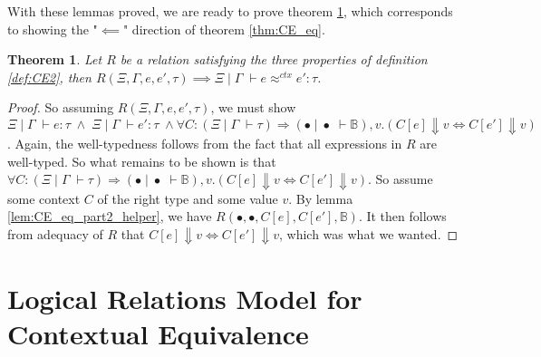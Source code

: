 \documentclass[a4paper, 11pt]{report}
\newtheorem{theorem}{Theorem}
\theoremstyle{definition}
\newcommand{\expr}{e}
\newcommand{\val}{v}
\newcommand{\ctx}{C}
\newcommand{\Tbool}{\mathbb{B}}
\newcommand{\typ}{\tau}
\newcommand{\venv}{\Gamma}
\newcommand{\tenv}{\Xi}
\newcommand{\emptenv}{\bullet}
\newcommand{\empvenv}{\bullet}
\newcommand{\jdg}[4]{#1 \; | \; #2 \; \vdash #3 : #4}
\newcommand{\jdgType}[3]{#1 \; | \; #2 \; \vdash #3}
\newcommand{\jdgRel}[6]{#1 \; | \; #2 \; \vdash #3 \approx^{#4} #5 : #6}
\newcommand{\ctxRel}[5]{\jdgRel{#1}{#2}{#3}{ctx}{#4}{#5}}
\begin{document}
With these lemmas proved, we are ready to prove theorem \ref{thm:CE_eq_part2}, which corresponds to showing the "$\impliedby$" direction of theorem \ref{thm:CE_eq}.
\begin{theorem}\label{thm:CE_eq_part2}
  Let $R$ be a relation satisfying the three properties of definition \ref{def:CE2}, then $R(\tenv, \venv, \expr, \expr', \typ) \implies \ctxRel{\tenv}{\venv}{\expr}{\expr'}{\typ}$.
\end{theorem}
\begin{proof}
  So assuming $R(\tenv, \venv, \expr, \expr', \typ)$, we must show 
  $\jdg{\tenv}{\venv}{\expr}{\typ} \; \land \; \jdg{\tenv}{\venv}{\expr'}{\typ} \; \land \forall \ctx : (\jdgType{\tenv}{\venv}{\typ}) \Rightarrow (\jdgType{\emptenv}{\empvenv}{\Tbool}), \val . (\ctx[\expr] \Downarrow \val \iff \ctx[\expr'] \Downarrow \val)$. Again, the well-typedness follows from the fact that all expressions in $R$ are well-typed. So what remains to be shown is that $\forall \ctx : (\jdgType{\tenv}{\venv}{\typ}) \Rightarrow (\jdgType{\emptenv}{\empvenv}{\Tbool}), \val . (\ctx[\expr] \Downarrow \val \iff \ctx[\expr'] \Downarrow \val)$. So assume some context $C$ of the right type and some value $\val$. By lemma \ref{lem:CE_eq_part2_helper}, we have $R(\emptenv, \empvenv, C[\expr], C[\expr'], \Tbool)$. It then follows from adequacy of $R$ that $\ctx[\expr] \Downarrow \val \iff \ctx[\expr'] \Downarrow \val$, which was what we wanted.
\end{proof}



\chapter{Logical Relations Model for Contextual Equivalence}
\label{ch:LR}
\end{document}
